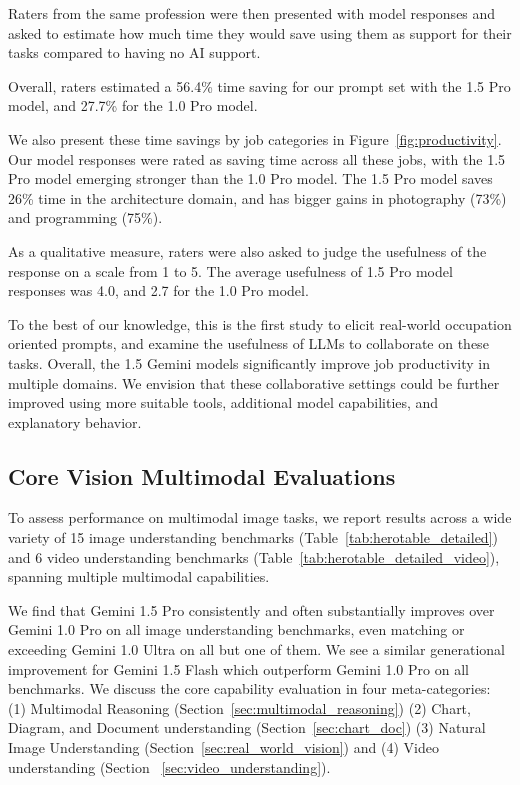 Raters from the same profession were then presented with model responses and asked to estimate how much time they would save using them as support for their tasks  compared to having no AI support. 

Overall, raters estimated a 56.4\% time saving for our prompt set with the 1.5 Pro model, and 27.7\% for the 1.0 Pro model.

We also present these time savings by job categories in 
 Figure~\ref{fig:productivity}. Our model responses were rated as saving time across all these jobs, with the 1.5 Pro model emerging stronger than the 1.0 Pro model. The 1.5 Pro model saves 26\% time in the architecture domain, and has bigger gains in photography (73\%) and programming (75\%).

As a qualitative measure, raters were also asked to judge the usefulness of the response on a scale from 1 to 5. The average usefulness of 1.5 Pro model responses was 4.0, and 2.7 for the 1.0 Pro model.

To the best of our knowledge, this is the first study to elicit real-world occupation oriented prompts, and examine the usefulness of LLMs to collaborate on these tasks. Overall, the 1.5 Gemini models significantly improve job productivity in multiple domains. We envision that these collaborative settings could be further improved using more suitable tools, additional model capabilities, and explanatory behavior.

\subsection{Core Vision Multimodal Evaluations}

To assess performance on multimodal image tasks, we report results across a wide variety of 15 image understanding benchmarks (Table~\ref{tab:herotable_detailed})  and 6 video understanding benchmarks (Table~\ref{tab:herotable_detailed_video}), spanning  multiple multimodal capabilities.

We find that Gemini 1.5 Pro consistently and often substantially improves over Gemini 1.0 Pro on all image understanding benchmarks, even matching or exceeding Gemini 1.0 Ultra on all but one of them. We see a similar generational improvement for Gemini 1.5 Flash which outperform Gemini 1.0 Pro on all benchmarks. We discuss the core capability evaluation in four meta-categories: (1) Multimodal Reasoning (Section~\ref{sec:multimodal_reasoning}) (2) Chart, Diagram, and Document understanding (Section~\ref{sec:chart_doc}) (3) Natural Image Understanding (Section~\ref{sec:real_world_vision}) and (4) Video understanding (Section~ \ref{sec:video_understanding}).

